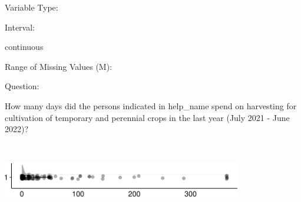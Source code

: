 \documentclass[
]{article}
\begin{document}
\begin{minipage}[t]{0.3\linewidth}

Variable Type:

\end{minipage}%
\begin{minipage}[t]{0.7\linewidth}

\end{minipage}

\begin{minipage}[t]{0.3\linewidth}

Interval:

\end{minipage}%
\begin{minipage}[t]{0.7\linewidth}

continuous

\end{minipage}

\begin{minipage}[t]{0.3\linewidth}

Range of Missing Values (M):

\end{minipage}%
\begin{minipage}[t]{0.7\linewidth}

\end{minipage}

\begin{minipage}[t]{0.3\linewidth}

Question:

\end{minipage}%
\begin{minipage}[t]{0.7\linewidth}

How many days did the persons indicated in help\_name spend on
harvesting for cultivation of temporary and perennial crops in the last
year (July 2021 - June 2022)?

\end{minipage}

\begin{minipage}[t]{0.3\linewidth}

~

\end{minipage}%
\begin{minipage}[t]{0.7\linewidth}

\includegraphics[width=396px]{codebook_template_files/figure-latex/q7_33_rainplot-1}

\end{minipage}
 \vspace*{-6mm} 
\end{document}
